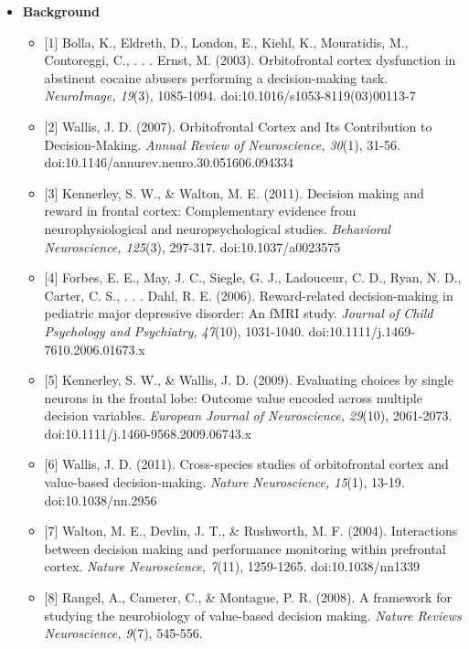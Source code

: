 \documentclass[11pt]{article}
\providecommand{\tightlist}{%
      \setlength{\itemsep}{0pt}\setlength{\parskip}{0pt}}
\begin{document}
    \begin{itemize}
\tightlist
\item
  \textbf{Background}

  \begin{itemize}
  \tightlist
  \item
    {[}1{]} Bolla, K., Eldreth, D., London, E., Kiehl, K., Mouratidis,
    M., Contoreggi, C., . . . Ernst, M. (2003). Orbitofrontal cortex
    dysfunction in abstinent cocaine abusers performing a
    decision-making task. \emph{NeuroImage, 19}(3), 1085-1094.
    doi:10.1016/s1053-8119(03)00113-7
  \item
    {[}2{]} Wallis, J. D. (2007). Orbitofrontal Cortex and Its
    Contribution to Decision-Making. \emph{Annual Review of
    Neuroscience, 30}(1), 31-56.
    doi:10.1146/annurev.neuro.30.051606.094334
  \item
    {[}3{]} Kennerley, S. W., \& Walton, M. E. (2011). Decision making
    and reward in frontal cortex: Complementary evidence from
    neurophysiological and neuropsychological studies. \emph{Behavioral
    Neuroscience, 125}(3), 297-317. doi:10.1037/a0023575
  \item
    {[}4{]} Forbes, E. E., May, J. C., Siegle, G. J., Ladouceur, C. D.,
    Ryan, N. D., Carter, C. S., . . . Dahl, R. E. (2006). Reward-related
    decision-making in pediatric major depressive disorder: An fMRI
    study. \emph{Journal of Child Psychology and Psychiatry, 47}(10),
    1031-1040. doi:10.1111/j.1469-7610.2006.01673.x
  \item
    {[}5{]} Kennerley, S. W., \& Wallis, J. D. (2009). Evaluating
    choices by single neurons in the frontal lobe: Outcome value encoded
    across multiple decision variables. \emph{European Journal of
    Neuroscience, 29}(10), 2061-2073.
    doi:10.1111/j.1460-9568.2009.06743.x
  \item
    {[}6{]} Wallis, J. D. (2011). Cross-species studies of orbitofrontal
    cortex and value-based decision-making. \emph{Nature Neuroscience,
    15}(1), 13-19. doi:10.1038/nn.2956
  \item
    {[}7{]} Walton, M. E., Devlin, J. T., \& Rushworth, M. F. (2004).
    Interactions between decision making and performance monitoring
    within prefrontal cortex. \emph{Nature Neuroscience, 7}(11),
    1259-1265. doi:10.1038/nn1339
  \item
    {[}8{]} Rangel, A., Camerer, C., \& Montague, P. R. (2008). A
    framework for studying the neurobiology of value-based decision
    making. \emph{Nature Reviews Neuroscience, 9}(7), 545-556.

\end{itemize}
\end{itemize}
\end{document}
